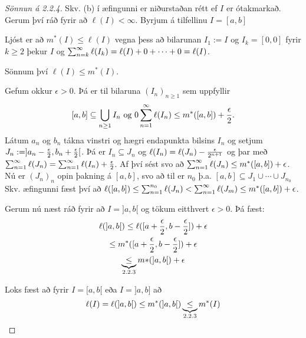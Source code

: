 \documentclass[12pt]{book} \usepackage[utf8]{inputenc}
\begin{document}
\section*{}
\begin{proof}[Sönnun á 2.2.4]
  Skv. (b) í æfingunni er niðurstaðan rétt ef $I$ er ótakmarkað. Gerum
  því ráð fyrir að $\ell(I) < \infty$. Byrjum á tilfellinu $I = [a,b]$

    \begin{ath}
      Ljóst er að $m^{*}(I) \leq \ell(I)$ vegna þess að bilarunan
      $I_1 := I$ og $I_k = [0,0]$ fyrir $k \geq 2$ þekur $I$ og
      $\sum_{n = {k}}^{\infty} \ell(I_k) = \ell(I) + 0 + \dotsb + 0 = \ell(I)$.
        
      Sönnum því $\ell(I) \leq m^{*} (I)$.
    \end{ath}
    Gefum okkur $\epsilon > 0$. Þá er til bilaruna $(I_n)_{n \geq 1}$
    sem uppfyllir
    \[[a,b] \subseteq \bigcup_{n \geq 1} I_n \text{ og } 0 \sum_{n = 1}^{\infty}
    \ell(I_n) \leq m^{*}([a,b]) + \frac{\epsilon}{2}.\]
    Látum $a_n$ og $b_n$ tákna vinstri og hægri endapunkta bilsins
    $I_n$ og setjum $J_n := ]a_n - \frac{\epsilon}{2}, b_n + \frac{\epsilon}{2}[$.  Þá er
    $I_n \subseteq J_n$ og $\ell(I_n) = \ell(J_n) - \frac{\epsilon}{2^{n+1}}$ og
    þar með $\sum_{n = 1}^{\infty} \ell(J_n) = \sum_{n = 1}^{\infty} \ell(I_n) + \frac{\epsilon}{2}$.
    Af því sést svo að
    $\sum_{n = 1}^{\infty} \ell(J_n) \leq m^{*}([a,b]) + \epsilon$.  Nú er
    $(J_n)_n$ opin þakning á $[a,b]$, svo að til er $n_0$ þ.a.
    $[a,b] \subseteq J_1 \cup \dotsb \cup J_{n_0}$ Skv. æfingunni fæst
    því að
    $\ell([a,b]) \leq \sum_{n =1}^{n_0} \ell(J_n) < \sum_{n = 1}^{\infty}
    \ell(J_m) \leq m^{*} ([a,b]) + \epsilon$.

    Gerum nú næst ráð fyrir að $I = ]a,b[$ og tökum eitthvert
    $\epsilon > 0$. Þá fæst:
    \begin{gather*}
      \ell(]a,b[)  \leq \ell([a + \frac{\epsilon}{2}, b - \frac{\epsilon}{2}]) + \epsilon \\
      \leq m^{*}([a + \frac{\epsilon}{2}, b - \frac{\epsilon}{2}]) + \epsilon \\
      \underbrace{\leq}_{\text{2.2.3}} m{*}(]a,b[) + \epsilon
    \end{gather*}


    Loks fæst að fyrir $I = [a,b[$ eða $I = ]a,b]$ að
    \[\ell(I) = \ell(]a,b[) \leq m^*(]a,b[) \underbrace{\leq}_{\text{2.2.3}} m^*(I)\]
  \end{proof}
\end{document}
